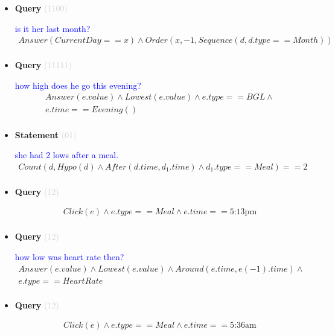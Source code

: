 \documentclass[11pt]{article}
\newcommand{\key}[1]{\textcolor{lightgray}{#1}}
\newcounter{CQuery}
\newcounter{CStatement}
\begin{document}
\begin{itemize}
\item
\textbf{Query\theCQuery} \key{(1100)} \addtocounter{CQuery}{1}
\textcolor{blue}{ is it her last month? }
\begin{multline*}
Answer(CurrentDay==x) \wedge Order(x, -1, Sequence(d, d.type==Month)) \\ 
\end{multline*}


\item
\textbf{Query\theCQuery} \key{(11111)} \addtocounter{CQuery}{1}
\textcolor{blue}{ how high does he go this evening? }
\begin{multline*}
Answer(e.value) \wedge Lowest(e.value) \wedge e.type==BGL \wedge \\ 
e.time==Evening() \\ 
\end{multline*}


\item
\textbf{Statement\theCStatement} \key{(01)} \addtocounter{CStatement}{1}
\textcolor{blue}{ she had 2 lows after a meal. }
\begin{multline*}
Count(d, Hypo(d) \wedge After(d.time, d_1.time) \wedge d_1.type==Meal)==2 \\ 
\end{multline*}


\item
\textbf{Query\theCQuery} \key{(12)} \addtocounter{CQuery}{1}
\textcolor{blue}{  }
\begin{multline*}
Click(e) \wedge e.type == Meal \wedge e.time==\mbox{5:13pm} \\ 
\end{multline*}


\item
\textbf{Query\theCQuery} \key{(12)} \addtocounter{CQuery}{1}
\textcolor{blue}{ how low was heart rate then? }
\begin{multline*}
Answer(e.value) \wedge Lowest(e.value) \wedge Around(e.time, e(-1).time) \wedge \\ 
e.type==HeartRate \\ 
\end{multline*}


\item
\textbf{Query\theCQuery} \key{(12)} \addtocounter{CQuery}{1}
\textcolor{blue}{  }
\begin{multline*}
Click(e) \wedge e.type == Meal \wedge e.time==\mbox{5:36am} \\ 
\end{multline*}



\end{itemize}
\end{document}
